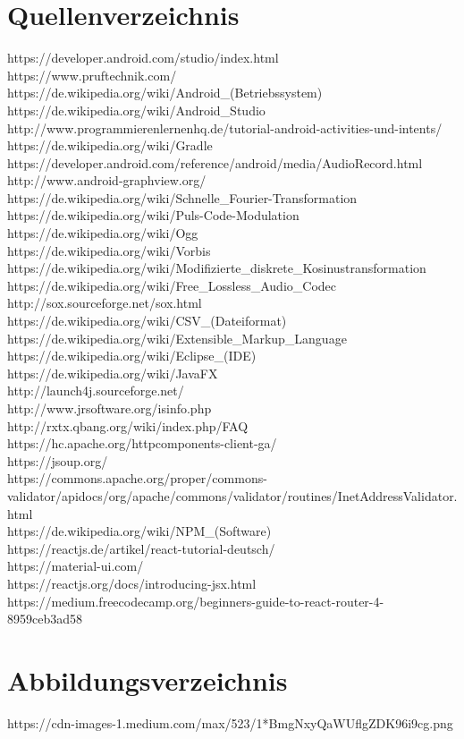 \documentclass{article}
\begin{document}
\section{Quellenverzeichnis}

https://developer.android.com/studio/index.html\\
https://www.pruftechnik.com/\\
https://de.wikipedia.org/wiki/Android\_(Betriebssystem)\\
https://de.wikipedia.org/wiki/Android\_Studio\\
http://www.programmierenlernenhq.de/tutorial-android-activities-und-intents/\\
https://de.wikipedia.org/wiki/Gradle\\
https://developer.android.com/reference/android/media/AudioRecord.html\\
http://www.android-graphview.org/\\
https://de.wikipedia.org/wiki/Schnelle\_Fourier-Transformation\\
https://de.wikipedia.org/wiki/Puls-Code-Modulation\\
https://de.wikipedia.org/wiki/Ogg\\
https://de.wikipedia.org/wiki/Vorbis\\
https://de.wikipedia.org/wiki/Modifizierte\_diskrete\_Kosinustransformation\\
https://de.wikipedia.org/wiki/Free\_Lossless\_Audio\_Codec\\
http://sox.sourceforge.net/sox.html\\
https://de.wikipedia.org/wiki/CSV\_(Dateiformat)\\
https://de.wikipedia.org/wiki/Extensible\_Markup\_Language\\
https://de.wikipedia.org/wiki/Eclipse\_(IDE)\\
https://de.wikipedia.org/wiki/JavaFX\\
http://launch4j.sourceforge.net/\\
http://www.jrsoftware.org/isinfo.php\\
http://rxtx.qbang.org/wiki/index.php/FAQ\\
https://hc.apache.org/httpcomponents-client-ga/\\
https://jsoup.org/\\
https://commons.apache.org/proper/commons-validator/apidocs/org/apache/commons/validator/routines/InetAddressValidator.html\\
https://de.wikipedia.org/wiki/NPM\_(Software)\\
https://reactjs.de/artikel/react-tutorial-deutsch/\\
https://material-ui.com/\\
https://reactjs.org/docs/introducing-jsx.html\\
https://medium.freecodecamp.org/beginners-guide-to-react-router-4-8959ceb3ad58\\

\section{Abbildungsverzeichnis}
https://cdn-images-1.medium.com/max/523/1*BmgNxyQaWUflgZDK96i9cg.png
\end{document}

